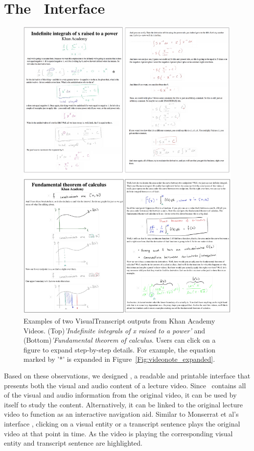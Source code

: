 \section{The \systemname\ Interface}
\begin{figure}[h!]
    \centering
        \includegraphics[width=\textwidth]{figures/videonote_example.pdf}
    \caption{Examples of two VisualTranscript outputs from Khan Academy Videos. (Top)\textit{'Indefinite integrals of x raised to a power'} and (Bottom)\textit{'Fundamental theorem of calculus}. Users can click on a figure to expand step-by-step details. For example, the equation marked by '*' is expanded in Figure~\ref{Fig:videonote_expanded}.}
    \label{Fig:videonote_example}
\end{figure}
%
Based on these observations, we designed \textbf{\systemname}, a readable and printable interface that presents both the visual and audio content of a lecture video. Since \systemname\ contains all of the visual and audio information from the original video, it can be used by itself to study the content. Alternatively, it can be linked to the original lecture video to function as an interactive navigation aid. Similar to Monserrat et al's interface \cite{monserrat2013notevideo}, clicking on a visual entity or a transcript sentence plays the original video at that point in time. As the video is playing the corresponding visual entity and transcript sentence are highlighted. \\

